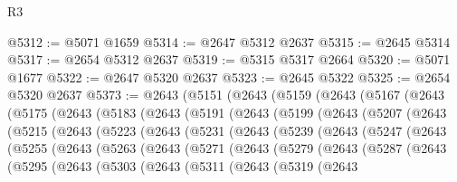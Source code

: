 \begin{lexlean}{R3}
\begin{coremodule}
@5312 := @5071 @1659
@5314 := @2647 @5312 @2637
@5315 := @2645 @5314
@5317 := @2654 @5312 @2637
@5319 := @5315 @5317 @2664
@5320 := @5071 @1677
@5322 := @2647 @5320 @2637
@5323 := @2645 @5322
@5325 := @2654 @5320 @2637
@5373 := @2643
    (@5151
      (@2643
        (@5159
          (@2643
            (@5167
              (@2643
                (@5175
                  (@2643
                    (@5183
                      (@2643
                        (@5191
                          (@2643
                            (@5199
                              (@2643
                                (@5207
                                  (@2643
                                    (@5215
                                      (@2643
                                        (@5223
                                          (@2643
                                            (@5231
                                              (@2643
                                                (@5239
                                                  (@2643
                                                    (@5247
                                                      (@2643
                                                        (@5255
                                                          (@2643
                                                            (@5263
                                                              (@2643
                                                                (@5271
                                                                  (@2643
                                                                    (@5279
                                                                      (@2643
                                                                        (@5287
                                                                          (@2643
                                                                            (@5295
                                                                              (@2643
                                                                                (@5303
                                                                                  (@2643
                                                                                    (@5311
                                                                                      (@2643
                                                                                        (@5319
                                                                                          (@2643

\end{coremodule}
\end{lexlean}
